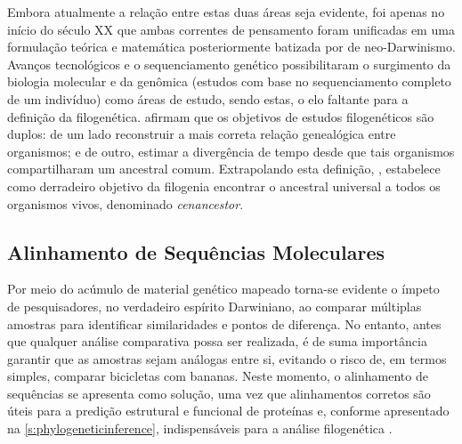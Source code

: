 \documentclass[english,brazilian]{UNISINOSmonografia} %
\begin{document}
Embora atualmente a relação entre estas duas áreas seja evidente, foi apenas no início do século XX que ambas correntes de pensamento foram unificadas em uma formulação teórica e matemática posteriormente batizada por  de neo-Darwinismo.
Avanços tecnológicos e o sequenciamento genético possibilitaram o surgimento da biologia molecular e da genômica (estudos com base no sequenciamento completo de um indivíduo) como áreas de estudo, sendo estas, o elo faltante para a definição da filogenética.
 afirmam que os objetivos de estudos filogenéticos são duplos: de um lado reconstruir a mais correta relação genealógica entre organismos; e de outro, estimar a divergência de tempo desde que tais organismos compartilharam um ancestral comum.
Extrapolando esta definição, , estabelece como derradeiro objetivo da filogenia encontrar o ancestral universal a todos os organismos vivos, denominado \textit{cenancestor}.




\subsection{Alinhamento de Sequências Moleculares}


Por meio do acúmulo de material genético mapeado torna-se evidente o ímpeto de pesquisadores, no verdadeiro espírito Darwiniano, ao comparar múltiplas amostras para identificar similaridades e pontos de diferença.
No entanto, antes que qualquer análise comparativa possa ser realizada, é de suma importância garantir que as amostras sejam análogas entre si, evitando o risco de, em termos simples, comparar bicicletas com bananas.
Neste momento, o alinhamento de sequências se apresenta como solução, uma vez que alinhamentos corretos são úteis para a predição estrutural e funcional de proteínas e, conforme apresentado na \autoref{s:phylogeneticinference}, indispensáveis para a análise filogenética \cite{biofordummies2007}.


\end{document}
